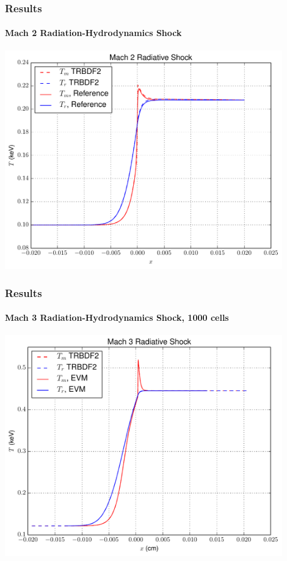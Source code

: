 \documentclass[xcolor=dvipsnames,fontsize=8pt]{beamer}
\begin{document}
\begin{frame}
\frametitle{Results}
\framesubtitle{Mach 2 Radiation-Hydrodynamics Shock}

\begin{center}
\includegraphics[width=0.9\textwidth]{./figures/mach2_shock.pdf}
\end{center}
\end{frame}

\begin{frame}
\frametitle{Results}
\framesubtitle{Mach 3 Radiation-Hydrodynamics Shock, 1000 cells}
\begin{center}
\includegraphics[width=0.9\textwidth]{./figures/mach3_shock.pdf}
\end{center}
\end{frame}
\end{document}
